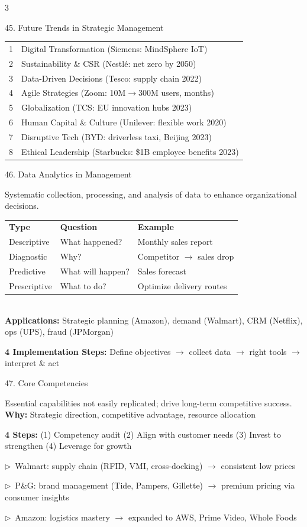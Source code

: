 \documentclass[7.5pt, letterpaper]{article}
\newcommand{\concept}[1]{%
  \vspace{2.5pt}%
  \noindent\colorbox{accent}{\parbox{\dimexpr\linewidth-2\fboxsep}{\fontsize{6.8pt}{7.5pt}\selectfont\bfseries\color{white}\strut #1\strut}}%
  \vspace{1pt}\par%
}
\newcommand{\kv}[2]{\noindent\textbf{#1:} #2\par}
\newcommand{\bul}[1]{\noindent$\triangleright$\ #1\par}
\newcommand{\minitab}[1]{%
  \begingroup
  \fontsize{6.2pt}{7pt}\selectfont
  \setlength{\tabcolsep}{2pt}
  #1
  \endgroup
}
\begin{document}
\begin{multicols}{3}
\concept{45. Future Trends in Strategic Management}
\minitab{\begin{tabular}{@{}ll@{}}
1 & Digital Transformation (Siemens: MindSphere IoT)\\
2 & Sustainability \& CSR (Nestl\'{e}: net zero by 2050)\\
3 & Data-Driven Decisions (Tesco: supply chain 2022)\\
4 & Agile Strategies (Zoom: 10M$\to$300M users, months)\\
5 & Globalization (TCS: EU innovation hubs 2023)\\
6 & Human Capital \& Culture (Unilever: flexible work 2020)\\
7 & Disruptive Tech (BYD: driverless taxi, Beijing 2023)\\
8 & Ethical Leadership (Starbucks: \$1B employee benefits 2023)\\
\end{tabular}}

\concept{46. Data Analytics in Management}
Systematic collection, processing, and analysis of data to enhance organizational decisions.\\
\minitab{\begin{tabular}{@{}lll@{}}
\textbf{Type} & \textbf{Question} & \textbf{Example}\\
Descriptive & What happened? & Monthly sales report\\
Diagnostic & Why? & Competitor $\to$ sales drop\\
Predictive & What will happen? & Sales forecast\\
Prescriptive & What to do? & Optimize delivery routes\\
\end{tabular}}\\
\kv{Applications}{Strategic planning (Amazon), demand (Walmart), CRM (Netflix), ops (UPS), fraud (JPMorgan)}
\kv{4 Implementation Steps}{Define objectives $\to$ collect data $\to$ right tools $\to$ interpret \& act}

\concept{47. Core Competencies}
Essential capabilities not easily replicated; drive long-term competitive success.\\
\kv{Why}{Strategic direction, competitive advantage, resource allocation}
\kv{4 Steps}{(1) Competency audit (2) Align with customer needs (3) Invest to strengthen (4) Leverage for growth}
\bul{Walmart: supply chain (RFID, VMI, cross-docking) $\to$ consistent low prices}
\bul{P\&G: brand management (Tide, Pampers, Gillette) $\to$ premium pricing via consumer insights}
\bul{Amazon: logistics mastery $\to$ expanded to AWS, Prime Video, Whole Foods}


\end{multicols}
\end{document}
